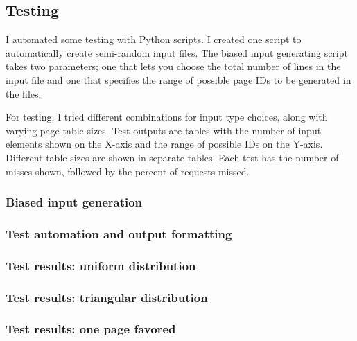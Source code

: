 \documentclass[paper=a4, fontsize=11pt]{scrartcl} %
\numberwithin{equation}{section} %
\numberwithin{figure}{section} %
\numberwithin{table}{section} %
\begin{document}

\subsection{Testing}
I automated some testing with Python scripts. I created one script to automatically create semi-random input files. The biased input generating script takes two parameters; one that lets you choose the total number of lines in the input file and one that specifies the range of possible page IDs to be generated in the files.

For testing, I tried different combinations for input type choices, along with varying page table sizes. Test outputs are tables with the number of input elements shown on the X-axis and the range of possible IDs on the Y-axis. Different table sizes are shown in separate tables. Each test has the number of misses shown, followed by the percent of requests missed.

\subsubsection{Biased input generation}

\pagebreak

\subsubsection{Test automation and output formatting}

\pagebreak

\subsubsection{Test results: uniform distribution}

\pagebreak

\subsubsection{Test results: triangular distribution}

\pagebreak

\subsubsection{Test results: one page favored}


\end{document}

